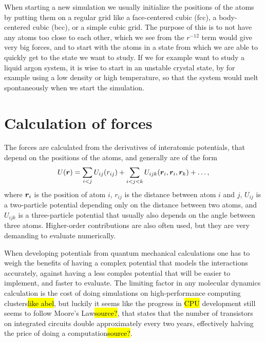 When starting a new simulation we usually initialize the positions of the atoms by putting them on a regular grid like a face-centered cubic (fcc), a body-centered cubic (bcc), or a simple cubic grid. The purpose of this is to not have any atoms too close to each other, which we see from the $r^{-12}$ term would give very big forces, and to start with the atoms in a state from which we are able to quickly get to the state we want to study. If we for example want to study a liquid argon system, it is wise to start in an unstable crystal state, by for example using a low density or high temperature, so that the system would melt spontaneously when we start the simulation.

\section{Calculation of forces}
The forces are calculated from the derivatives of interatomic potentials, that depend on the positions of the atoms, and generally are of the form
\begin{align*}
    U(\boldsymbol{r}) = \sum_{i<j} U_{ij}(r_{ij}) + \sum_{i<j<k} U_{ijk}(\boldsymbol{r}_i, \boldsymbol{r}_i, \boldsymbol{r}_k) + \dots,
\end{align*}
where $\boldsymbol{r}_i$ is the position of atom $i$, $r_{ij}$ is the distance between atom $i$ and $j$, $U_{ij}$ is a two-particle potential depending only on the distance between two atoms, and $U_{ijk}$ is a three-particle potential that usually also depends on the angle between three atoms. Higher-order contributions are also often used, but they are very demanding to evaluate numerically.

When developing potentials from quantum mechanical calculations one has to weigh the benefits of having a complex potential that models the interactions accurately, against having a less comples potential that will be easier to implement, and faster to evaluate. The limiting factor in any molecular dynamics calculation is the cost of doing simulations on high-performance computing clusters\hl{like abel}, but luckily it seems like the progress in \hl{CPU} development still seems to follow Moore's Law\hl{source?}, that states that the number of transistors on integrated circuits double approximately every two years\cite{moore1965cramming}, effectively halving the price of doing a computation\hl{source?}.

